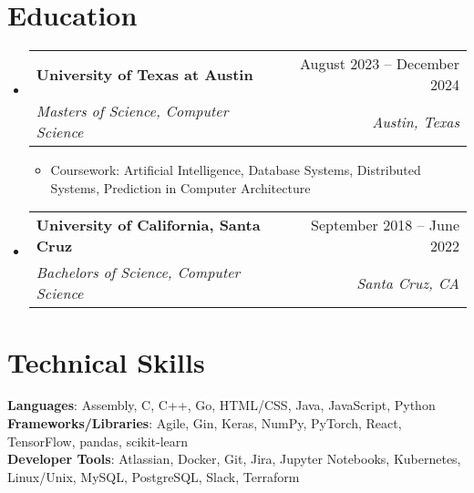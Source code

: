 \documentclass[letterpaper,11pt]{article}
\makeatletter
\newcommand{\resumeItem}[1]{
    \item\small{
      {#1 \vspace{-2pt}}
    }
  }
\newcommand{\resumeSubheading}[4]{
    \vspace{-2pt}\item
      \begin{tabular*}{0.97\textwidth}[t]{l@{\extracolsep{\fill}}r}
        \textbf{#1} & #2 \\
        \textit{\small#3} & \textit{\small #4} \\
      \end{tabular*}\vspace{-7pt}
  }
\newcommand{\resumeProjectHeading}[2]{
      \item
      \begin{tabular*}{0.97\textwidth}{l@{\extracolsep{\fill}}r}
        \small#1 & #2 \\
      \end{tabular*}\vspace{-7pt}
  }
\newcommand{\resumeSubHeadingListStart}{\begin{itemize}[leftmargin=0.15in, label={}]}
\newcommand{\resumeSubHeadingListEnd}{\end{itemize}}
\newcommand{\resumeItemListStart}{\begin{itemize}}
\newcommand{\resumeItemListEnd}{\end{itemize}\vspace{-5pt}}
\makeatother
\begin{document}


\section{Education}
  \resumeSubHeadingListStart
    \resumeSubheading{University of Texas at Austin}{August 2023 -- December 2024}{Masters of Science, Computer Science}{Austin, Texas}
      \resumeItemListStart
        \resumeItem{Coursework: Artificial Intelligence, Database Systems, Distributed Systems, Prediction in Computer Architecture}
    \resumeItemListEnd

    \resumeSubheading{University of California, Santa Cruz}{September 2018 -- June 2022}{Bachelors of Science, Computer Science}{Santa Cruz, CA}
    \resumeSubHeadingListEnd

\section{Technical Skills}

  \begin{itemize}[leftmargin=0.15in, label={}]
    \small{\item{
      \textbf{Languages}{: Assembly, C, C++, Go, HTML/CSS, Java, JavaScript, Python} \\
      \textbf{Frameworks/Libraries}{: Agile, Gin, Keras, NumPy, PyTorch, React, TensorFlow, pandas, scikit-learn} \\
      \textbf{Developer Tools}{: Atlassian, Docker, Git, Jira, Jupyter Notebooks, Kubernetes, Linux/Unix, MySQL, PostgreSQL, Slack, Terraform}}}
  \end{itemize}
\end{document}
